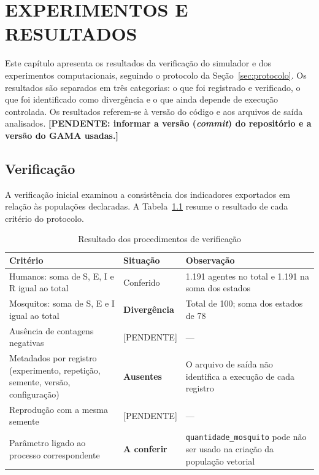 \chapter{EXPERIMENTOS E RESULTADOS}
\label{cap:resultados}

Este capítulo apresenta os resultados da verificação do simulador e dos experimentos computacionais, seguindo o protocolo da Seção~\ref{sec:protocolo}. Os resultados são separados em três categorias: o que foi registrado e verificado, o que foi identificado como divergência e o que ainda depende de execução controlada. Os resultados referem-se à versão do código e aos arquivos de saída analisados. \textbf{[PENDENTE: informar a versão (\textit{commit}) do repositório e a versão do GAMA usadas.]}

\section{Verificação}
\label{sec:res-verificacao}

A verificação inicial examinou a consistência dos indicadores exportados em relação às populações declaradas. A Tabela~\ref{tab:res-verificacao} resume o resultado de cada critério do protocolo.

\begin{table}[htb]
    \centering
    \caption{Resultado dos procedimentos de verificação}
    \label{tab:res-verificacao}
    \begin{tabular}{p{4.6cm} p{3.0cm} p{6.2cm}}
        \hline
        \textbf{Critério} & \textbf{Situação} & \textbf{Observação} \\
        \hline
        Humanos: soma de S, E, I e R igual ao total & Conferido & 1.191 agentes no total e 1.191 na soma dos estados \\
        Mosquitos: soma de S, E e I igual ao total & \textbf{Divergência} & Total de 100; soma dos estados de 78 \\
        Ausência de contagens negativas & [PENDENTE] & --- \\
        Metadados por registro (experimento, repetição, semente, versão, configuração) & \textbf{Ausentes} & O arquivo de saída não identifica a execução de cada registro \\
        Reprodução com a mesma semente & [PENDENTE] & --- \\
        Parâmetro ligado ao processo correspondente & \textbf{A conferir} & \texttt{quantidade\_mosquito} pode não ser usado na criação da população vetorial \\
        \hline
    \end{tabular}
\end{table}

